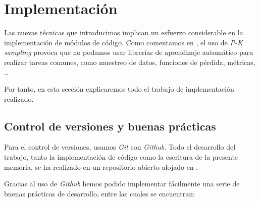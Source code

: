 \chapter{Implementación} \label{ich:implementacion}

Las nuevas técnicas que introducimos implican un esfuerzo considerable en la implementación de módulos de código. Como comentamos en , el uso de \textit{P-K sampling} provoca que no podamos usar librerías de aprendizaje automático para realizar tareas comunes, como muestreo de datos, funciones de pérdida, métricas, \ldots

Por tanto, en esta sección explicaremos todo el trabajo de implementación realizado.

\section{Control de versiones y buenas prácticas} \label{isec:github_buenas_practicas}

Para el control de versiones, usamos \textit{Git} con \textit{Github}. Todo el desarrollo del trabajo, tanto la implementación de código como la escritura de la presente memoria, se ha realizado en un repositorio abierto alojado en \cite{informatica:repogithub}.

Gracias al uso de \textit{Github} hemos podido implementar fácilmente una serie de buenas prácticas de desarrollo, entre las cuales se encuentran:

